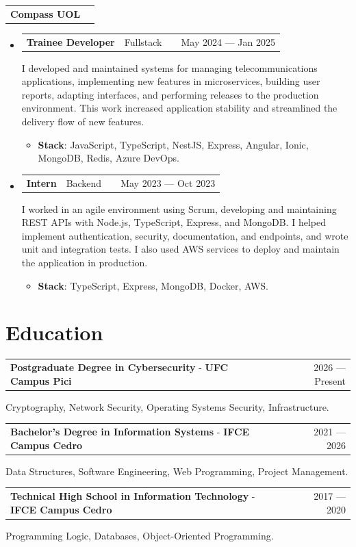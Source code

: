 \documentclass[a4paper,12pt]{article}
\makeatletter
\newenvironment{joblong}[2]{
  \begin{tabularx}{\linewidth}{@{}l X@{}}
    \textbf{#1} & \if\relax\detokenize{#2}\relax\else #2\fi \\
  \end{tabularx}
  \begin{itemize}[leftmargin=1.5em,label={},itemsep=5pt,topsep=0pt]
}{
  \end{itemize}
}
\newenvironment{role}[3]{
  \item
  \begin{tabularx}{\linewidth}{@{}l X r@{}}
    {\small\textbf{#1}}\ \ {\footnotesize\if\relax\detokenize{#3}\relax\else #3\fi} & \hfill & #2 \\
  \end{tabularx}
    }
    {
    }
\newenvironment{education}[3]
    {
    \begin{tabularx}{\linewidth}{@{}l X r@{}}
    \textbf{#1} - \textbf{#2} & \hfill &  #3 \\[3.75pt]
    \end{tabularx}
    }
    {
    }
\makeatother
\begin{document}
\begin{joblong}{Compass UOL}{}
  \begin{role}{Trainee Developer}{May 2024 — Jan 2025}{Fullstack}
    I developed and maintained systems for managing telecommunications applications, implementing new features in microservices, building user reports, adapting interfaces, and performing releases to the production environment. This work increased application stability and streamlined the delivery flow of new features.
    \begin{itemize}[nosep,after=\strut, leftmargin=0em, itemsep=3pt,label={}]
        \item \textbf{Stack}: JavaScript, TypeScript, NestJS, Express, Angular, Ionic, MongoDB, Redis, Azure DevOps.
    \end{itemize}
  \end{role}
  \begin{role}{Intern}{May 2023 — Oct 2023}{Backend}
    I worked in an agile environment using Scrum, developing and maintaining REST APIs with Node.js, TypeScript, Express, and MongoDB. I helped implement authentication, security, documentation, and endpoints, and wrote unit and integration tests. I also used AWS services to deploy and maintain the application in production.
    \begin{itemize}[nosep,after=\strut, leftmargin=0em, itemsep=3pt,label={}]
        \item \textbf{Stack}: TypeScript, Express, MongoDB, Docker, AWS.
    \end{itemize}
  \end{role}
\end{joblong}
  

\section{Education}
    
\begin{education}{Postgraduate Degree in Cybersecurity}{UFC Campus Pici}{2026 — Present}
Cryptography, Network Security, Operating Systems Security, Infrastructure.
\end{education}

\begin{education}{Bachelor's Degree in Information Systems}{IFCE Campus Cedro}{2021 — 2026}
Data Structures, Software Engineering, Web Programming, Project Management.
\end{education}

\begin{education}{Technical High School in Information Technology}{IFCE Campus Cedro}{2017 — 2020}
Programming Logic, Databases, Object-Oriented Programming.
\end{education}
\end{document}
